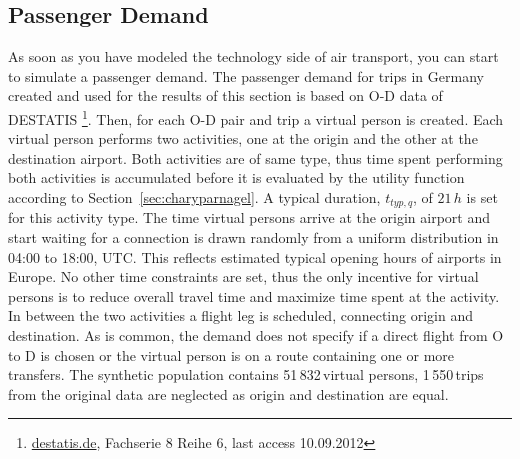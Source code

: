 \subsection{Passenger Demand}

As soon as you have modeled the technology side of air transport, you can start to simulate a passenger demand. 
The passenger demand for trips in Germany created and used for the results of this section is based on O-D data of DESTATIS 
\footnote{\url{destatis.de}, Fachserie 8 Reihe 6, last access 10.09.2012}. 
Then, for each O-D pair and trip a virtual person is created.
Each virtual person performs two activities, one at the origin and the other at the destination airport. 
Both activities are of same type, thus time spent performing both activities is accumulated before it is evaluated by the utility function according to Section~\ref{sec:charyparnagel}. %
A typical duration, $t_{typ,q}$, of $21 \, h$ is set for this activity type. 
The time virtual persons arrive at the origin airport and start waiting for a connection is drawn randomly from a uniform distribution in 04:00 to 18:00, UTC. 
This reflects estimated typical opening hours of airports in Europe.
No other time constraints are set, thus the only incentive for virtual persons is to reduce overall travel time and maximize time spent at the activity. 
In between the two activities a flight leg is scheduled, connecting origin and destination.
As is common, the demand does not specify if a direct flight from O to D is chosen or the virtual person is on a route containing one or more transfers.
The synthetic population contains 51\,832\,virtual persons, 1\,550\,trips from the original data are neglected as origin and destination are equal. 
%

